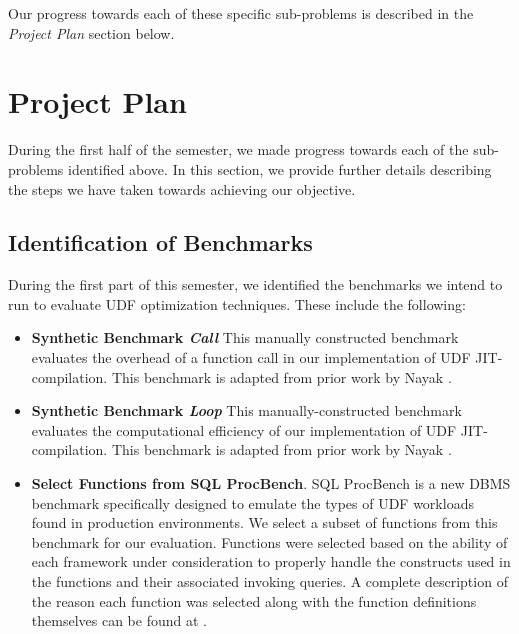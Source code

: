 \documentclass{vldb}
\begin{document}
Our progress towards each of these specific sub-problems is described in the \textit{Project Plan} section below.


\section{Project Plan}

During the first half of the semester, we made progress towards each of the sub-problems identified above. In this section, we provide further details describing the steps we have taken towards achieving our objective.

\subsection{Identification of Benchmarks} 

During the first part of this semester, we identified the benchmarks we intend to run to evaluate UDF optimization techniques. These include the following:

\begin{itemize}
    \item \textbf{Synthetic Benchmark \textit{Call}} This manually constructed benchmark evaluates the overhead of a function call in our implementation of UDF JIT-compilation. This benchmark is adapted from prior work by Nayak \cite{tanuj}.
    \item \textbf{Synthetic Benchmark \textit{Loop}} This manually-constructed benchmark evaluates the computational efficiency of our implementation of UDF JIT-compilation. This benchmark is adapted from prior work by Nayak \cite{tanuj}.
    \item \textbf{Select Functions from SQL ProcBench}. SQL ProcBench \cite{procbench} is a new DBMS benchmark specifically designed to emulate the types of UDF workloads found in production environments. We select a subset of functions from this benchmark for our evaluation. Functions were selected based on the ability of each framework under consideration to properly handle the constructs used in the functions and their associated invoking queries. A complete description of the reason each function was selected along with the function definitions themselves can be found at \cite{udf-jit}.
\end{itemize}
\end{document}
